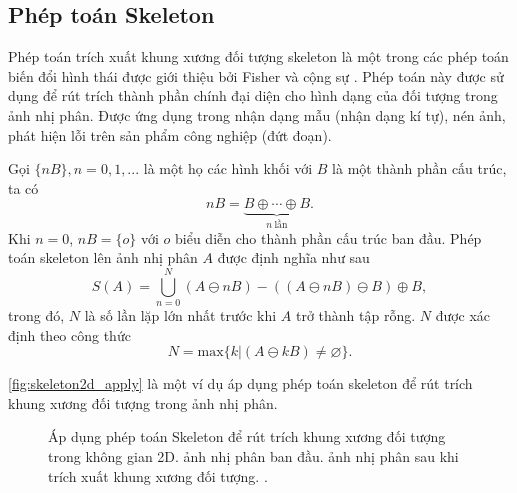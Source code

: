 \subsection{Phép toán Skeleton}
\label{subsec:phep_toan_skeleton}
	Phép toán trích xuất khung xương đối tượng skeleton là một trong các phép toán biến đổi hình thái được giới thiệu bởi Fisher và cộng sự \cite{hipr2thining}. Phép toán này được sử dụng để rút trích thành phần chính đại diện cho hình dạng của đối tượng trong ảnh nhị phân. Được ứng dụng trong nhận dạng mẫu (nhận dạng kí tự), nén ảnh, phát hiện lỗi trên sản phẩm công nghiệp (đứt đoạn).
	
	Gọi $\{nB\}, n= 0, 1, ...$ là một họ các hình khối với $B$ là một thành phần cấu trúc, ta có
	\begin{equation}
		nB = \underbrace{B\oplus \cdots \oplus B}_{n\ \text{lần}}.
		\label{eqn:skeleton_nb}
	\end{equation}
	Khi $n=0$, $nB=\{o\}$ với $o$ biểu diễn cho thành phần cấu trúc ban đầu. Phép toán skeleton lên ảnh nhị phân $A$ được định nghĩa như sau
	\begin{equation}
		S(A) = \bigcup_{n = 0}^N (A \ominus nB) - ((A \ominus nB) \ominus B)\oplus B,
		\label{eqn:skeleton}
	\end{equation}
	trong đó, $N$ là số lần lặp lớn nhất trước khi $A$ trở thành tập rỗng. $N$ được xác định theo công thức
	\begin{equation}
		N = \text{max}\{k|(A\ominus kB)\neq\varnothing\}.
	\label{eqn:skeleton_n}
	\end{equation}
	
	\autoref{fig:skeleton2d_apply} là một ví dụ áp dụng phép toán skeleton để rút trích khung xương đối tượng trong ảnh nhị phân.
	\begin{figure}[h!]
		\hfill
		\begin{subfigure}[b]{0.475\textwidth}
			\centering
			
			\caption{}
			\label{fig:skeleton2d_apply_before}
		\end{subfigure}
		\begin{subfigure}[b]{0.475\textwidth}
			\centering
			
			\caption{}
			\label{fig:skeleton2d_apply_after}
		\end{subfigure}
		\hfill\null
		\caption[Áp dụng phép toán Skeleton để rút trích khung xương đối tượng trong không gian 2D.]{Áp dụng phép toán Skeleton để rút trích khung xương đối tượng trong không gian 2D.  ảnh nhị phân ban đầu.  ảnh nhị phân sau khi trích xuất khung xương đối tượng. .}
		\label{fig:skeleton2d_apply}
	\end{figure}
	
